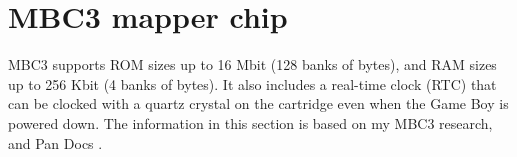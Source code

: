 \documentclass[\main/gbctr.tex]{subfiles}
\begin{document}
\chapter{MBC3 mapper chip}

MBC3 supports ROM sizes up to 16 Mbit (128 banks of  bytes), and RAM
sizes up to 256 Kbit (4 banks of  bytes). It also includes a
real-time clock (RTC) that can be clocked with a quartz crystal on the
cartridge even when the Game Boy is powered down. The information in this
section is based on my MBC3 research, and Pan Docs \cite{pandocs}.
\end{document}
